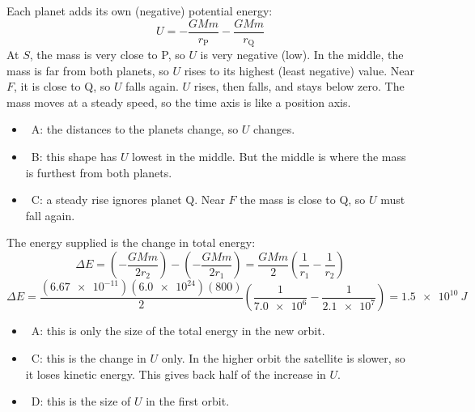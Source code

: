 \begin{practiceanswers}
\begin{practiceans}
  Each planet adds its own (negative) potential energy:
  \[ U = -\frac{GMm}{r_\mathrm{P}} - \frac{GMm}{r_\mathrm{Q}} \]
  At $S$, the mass is very close to P, so $U$ is very negative (low). In the middle, the mass is
  far from both planets, so $U$ rises to its highest (least negative) value. Near $F$, it is close
  to Q, so $U$ falls again. $U$ rises, then falls, and stays below zero. The mass moves at a
  steady speed, so the time axis is like a position axis.
  \begin{itemize}
    \item \xmark\ A: the distances to the planets change, so $U$ changes.
    \item \xmark\ B: this shape has $U$ lowest in the middle. But the middle is where the mass is
          furthest from both planets.
    \item \xmark\ C: a steady rise ignores planet Q. Near $F$ the mass is close to Q, so $U$ must
          fall again.
  \end{itemize}
\end{practiceans}

\begin{practiceans}
  The energy supplied is the change in total energy:
  \[ \Delta E = \left(-\frac{GMm}{2r_2}\right) - \left(-\frac{GMm}{2r_1}\right)
             = \frac{GMm}{2}\left(\frac{1}{r_1} - \frac{1}{r_2}\right) \]
  \[ \Delta E = \frac{(\num{6.67e-11})(\num{6.0e24})(800)}{2}
       \left(\frac{1}{\num{7.0e6}} - \frac{1}{\num{2.1e7}}\right) = \qty{1.5e10}{J} \]
  \begin{itemize}
    \item \xmark\ A: this is only the size of the total energy in the new orbit.
    \item \xmark\ C: this is the change in $U$ only. In the higher orbit the satellite is slower,
          so it loses kinetic energy. This gives back half of the increase in $U$.
    \item \xmark\ D: this is the size of $U$ in the first orbit.
  \end{itemize}
\end{practiceans}

\end{practiceanswers}
